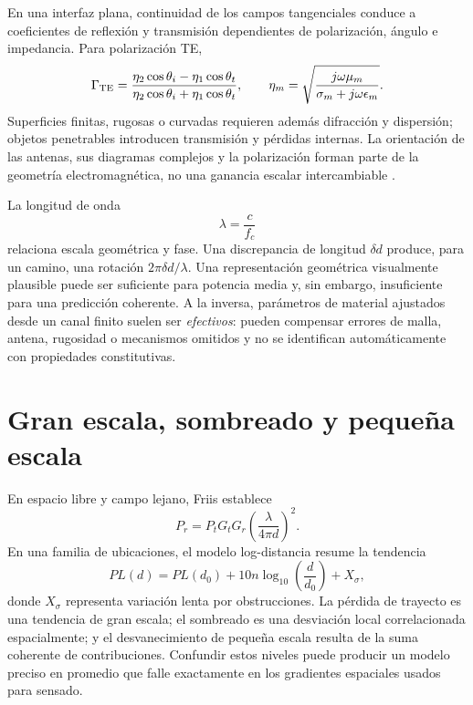 En una interfaz plana, continuidad de los campos tangenciales conduce a
coeficientes de reflexión y transmisión dependientes de polarización, ángulo e
impedancia. Para polarización TE,
\begin{equation}
\Gamma_{\rm TE}=
\frac{\eta_2\cos\theta_i-\eta_1\cos\theta_t}
{\eta_2\cos\theta_i+\eta_1\cos\theta_t},\qquad
\eta_m=\sqrt{\frac{j\omega\mu_m}{\sigma_m+j\omega\epsilon_m}}.
\end{equation}
Superficies finitas, rugosas o curvadas requieren además difracción y dispersión;
objetos penetrables introducen transmisión y pérdidas internas. La orientación
de las antenas, sus diagramas complejos y la polarización forman parte de la
geometría electromagnética, no una ganancia escalar intercambiable
\citep{Molisch2022,Rappaport2002}.

La longitud de onda
\begin{equation}
\lambda=\frac{c}{f_c}
\label{eq:wavelength}
\end{equation}
relaciona escala geométrica y fase. Una discrepancia de longitud $\delta d$
produce, para un camino, una rotación $2\pi\delta d/\lambda$. Una representación
geométrica visualmente plausible puede ser suficiente para potencia media y,
sin embargo, insuficiente para una predicción coherente. A la inversa, parámetros
de material ajustados desde un canal finito suelen ser \emph{efectivos}: pueden
compensar errores de malla, antena, rugosidad o mecanismos omitidos y no se
identifican automáticamente con propiedades constitutivas.

\section{Gran escala, sombreado y pequeña escala}

En espacio libre y campo lejano, Friis establece \citep{Friis1946}
\begin{equation}
P_r=P_tG_tG_r\left(\frac{\lambda}{4\pi d}\right)^2.
\label{eq:friis}
\end{equation}
En una familia de ubicaciones, el modelo log-distancia resume la tendencia
\begin{equation}
PL(d)=PL(d_0)+10n\log_{10}\!\left(\frac{d}{d_0}\right)+X_\sigma,
\label{eq:logdistance}
\end{equation}
donde $X_\sigma$ representa variación lenta por obstrucciones. La pérdida de
trayecto es una tendencia de gran escala; el sombreado es una desviación local
correlacionada espacialmente; y el desvanecimiento de pequeña escala resulta de
la suma coherente de contribuciones. Confundir estos niveles puede producir un
modelo preciso en promedio que falle exactamente en los gradientes espaciales
usados para sensado.

